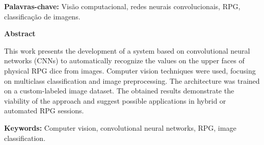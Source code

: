 \documentclass[12pt]{article}
\begin{document}
\vspace{0.5em}
\noindent
\textbf{Palavras-chave:} Visão computacional, redes neurais convolucionais, RPG, classificação de imagens.

\begin{center}
    \Large\textbf{Abstract}
\end{center}

\noindent
This work presents the development of a system based on convolutional neural networks (CNNs) to automatically 
recognize the values on the upper faces of physical RPG dice from images. Computer vision techniques were used, 
focusing on multiclass classification and image preprocessing. The architecture was trained on a custom-labeled 
image dataset. The obtained results demonstrate the viability of the approach and suggest possible applications 
in hybrid or automated RPG sessions.

\vspace{0.5em}
\noindent
\textbf{Keywords:} Computer vision, convolutional neural networks, RPG, image classification.
\newpage
\end{document}
